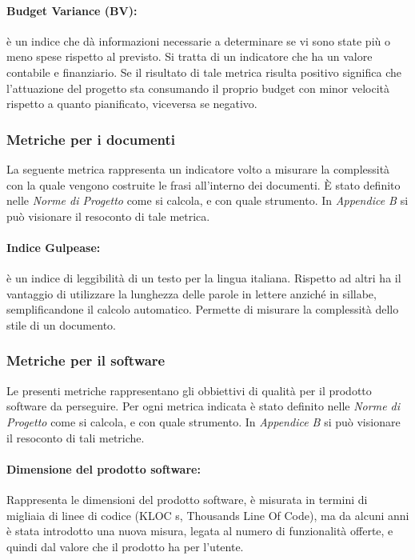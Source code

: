 \paragraph{Budget Variance (BV):} è un indice che dà informazioni necessarie a determinare se vi sono state più o meno spese rispetto al previsto. Si tratta di un indicatore che ha un valore contabile e finanziario. Se il risultato di tale metrica risulta positivo significa che l'attuazione del progetto sta consumando il proprio budget con minor velocità rispetto a quanto pianificato, viceversa se negativo.

\subsubsection{Metriche per i documenti}
La seguente metrica rappresenta un indicatore volto a misurare la complessità con la quale vengono costruite le frasi all'interno dei documenti.
È stato definito nelle \emph{Norme di Progetto \VersioneNP{}} come si calcola, e con quale strumento. In \emph{Appendice B} si può visionare il resoconto di tale metrica.

\paragraph{Indice Gulpease:} è un indice di leggibilità di un testo per la lingua italiana.
Rispetto ad altri ha il vantaggio di utilizzare la lunghezza delle parole in lettere anziché in sillabe, semplificandone il calcolo automatico. Permette di misurare la complessità dello stile di un documento.

\subsubsection{Metriche per il software}
Le presenti metriche rappresentano gli obbiettivi di qualità per il prodotto software da perseguire.
Per ogni metrica indicata è stato definito nelle \emph{Norme di Progetto \VersioneNP{}} come si calcola, e con quale strumento. In \emph{Appendice B} si può visionare il resoconto di tali metriche.

\paragraph{Dimensione del prodotto software:} Rappresenta le dimensioni del prodotto software, è misurata in termini di migliaia di linee di codice (KLOC s, Thousands Line Of Code), ma da alcuni anni è stata introdotto una nuova misura, legata al numero di funzionalità offerte, e quindi dal valore che il prodotto ha per l’utente.

